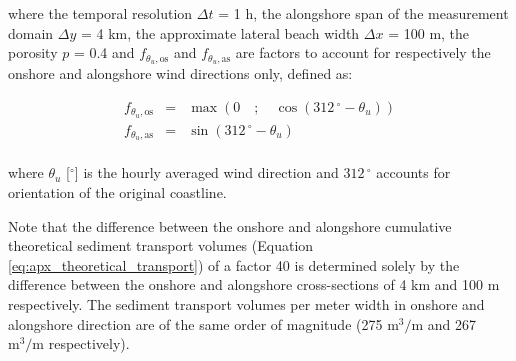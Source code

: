 \noindent where the temporal resolution $\Delta t$ = 1 h, the
alongshore span of the measurement domain $\Delta y$ = 4 km, the
approximate lateral beach width $\Delta x$ = 100 m, the porosity $p$ =
0.4 and $f_{\theta_u,\mathrm{os}}$ and $f_{\theta_u,\mathrm{as}}$ are
factors to account for respectively the onshore and alongshore wind
directions only, defined as:

\begin{equation}
  \begin{array}{lcl}
    f_{\theta_u,\mathrm{os}} &=& \max \left( 0 \quad ; \quad \cos \left( 312\,^{\circ} - \theta_u \right) \right) \\
    f_{\theta_u,\mathrm{as}} &=& \sin \left( 312\,^{\circ} - \theta_u \right) \\
  \end{array}
\end{equation}

\noindent where $\theta_u$ [$^{\circ}$] is the hourly averaged wind
direction and $312\,^{\circ}$ accounts for orientation of the original
coastline.

Note that the difference between the onshore and alongshore cumulative
theoretical sediment transport volumes (Equation
\ref{eq:apx_theoretical_transport}) of a factor 40 is determined
solely by the difference between the onshore and alongshore
cross-sections of 4 km and 100 m respectively. The sediment transport
volumes per meter width in onshore and alongshore direction are of the
same order of magnitude (275 $\mathrm{m^3/m}$ and 267 $\mathrm{m^3/m}$
respectively).

